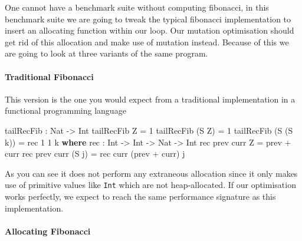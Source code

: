 \documentclass[
]{article}
\newenvironment{Shaded}{}{}
\newcommand{\DataTypeTok}[1]{\textcolor[rgb]{0.56,0.13,0.00}{#1}}
\newcommand{\DecValTok}[1]{\textcolor[rgb]{0.25,0.63,0.44}{#1}}
\newcommand{\KeywordTok}[1]{\textcolor[rgb]{0.00,0.44,0.13}{\textbf{#1}}}
\newcommand{\NormalTok}[1]{#1}
\newcommand{\OperatorTok}[1]{\textcolor[rgb]{0.40,0.40,0.40}{#1}}
\newcommand{\OtherTok}[1]{\textcolor[rgb]{0.00,0.44,0.13}{#1}}
\begin{document}
One cannot have a benchmark suite without computing fibonacci, in this
benchmark suite we are going to tweak the typical fibonacci
implementation to insert an allocating function within our loop. Our
mutation optimisation should get rid of this allocation and make use of
mutation instead. Because of this we are going to look at three variants
of the same program.

\hypertarget{traditional-fibonacci}{%
\paragraph{Traditional Fibonacci}\label{traditional-fibonacci}}

This version is the one you would expect from a traditional
implementation in a functional programming language

\begin{Shaded}
\begin{Highlighting}[]
\NormalTok{tailRecFib }\OperatorTok{:} \DataTypeTok{Nat} \OtherTok{{-}\textgreater{}} \DataTypeTok{Int}
\NormalTok{tailRecFib }\DataTypeTok{Z} \OtherTok{=} \DecValTok{1}
\NormalTok{tailRecFib (}\DataTypeTok{S} \DataTypeTok{Z}\NormalTok{) }\OtherTok{=} \DecValTok{1}
\NormalTok{tailRecFib (}\DataTypeTok{S}\NormalTok{ (}\DataTypeTok{S}\NormalTok{ k)) }\OtherTok{=}\NormalTok{ rec }\DecValTok{1} \DecValTok{1}\NormalTok{ k}
  \KeywordTok{where}
\NormalTok{    rec }\OperatorTok{:} \DataTypeTok{Int} \OtherTok{{-}\textgreater{}} \DataTypeTok{Int} \OtherTok{{-}\textgreater{}} \DataTypeTok{Nat} \OtherTok{{-}\textgreater{}} \DataTypeTok{Int}
\NormalTok{    rec prev curr }\DataTypeTok{Z} \OtherTok{=}\NormalTok{ prev }\OperatorTok{+}\NormalTok{ curr}
\NormalTok{    rec prev curr (}\DataTypeTok{S}\NormalTok{ j) }\OtherTok{=}\NormalTok{ rec curr (prev }\OperatorTok{+}\NormalTok{ curr) j}
\end{Highlighting}
\end{Shaded}

As you can see it does not perform any extraneous allocation since it
only makes use of primitive values like \texttt{Int} which are not
heap-allocated. If our optimisation works perfectly, we expect to reach
the same performance signature as this implementation.

\hypertarget{allocating-fibonacci}{%
\paragraph{Allocating Fibonacci}\label{allocating-fibonacci}}
\end{document}
